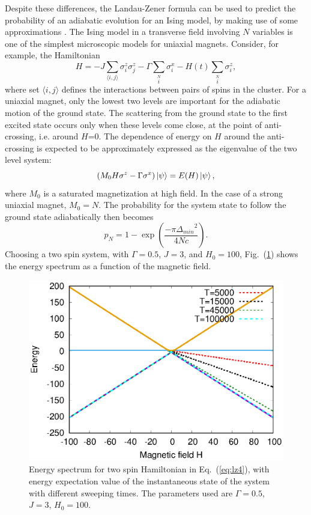 \documentclass[../main.tex]{subfiles}
\begin{document}
Despite these differences, the Landau-Zener formula can be used to predict the probability of an adiabatic evolution for an Ising model, by making use of some approximations \cite{miyashita1996observation}. The Ising model in a transverse field involving $N$ variables is one of the simplest microscopic models for uniaxial magnets. Consider, for example, the Hamiltonian
\begin{equation}
H=-J \sum \limits_{\langle i,j\rangle} \sigma_i^z \sigma_j^z - \Gamma \sum \limits_i \limits^N \sigma_i^x -H(t) \sum \limits_i \limits^N\sigma_i^z, \label{eq:lz4}
\end{equation} 
where set $\langle i,j \rangle$ defines the interactions between pairs of spins in the cluster. For a uniaxial magnet, only the lowest two levels are important for the adiabatic motion of the ground state. The scattering from the ground state to the first excited state occurs only when these levels come close, at the point of anti-crossing, i.e. around $H$=0. The dependence of energy on $H$ around the anti-crossing is expected to be approximately expressed  as the eigenvalue of the two level system:
\begin{equation}
(M_0H\sigma^z-\Gamma \sigma^x)\ket{\psi}=E(H)\ket{\psi}, \label{eq:lz6}
\end{equation}
where $M_0$ is a saturated magnetization at high field. In the case of a strong uniaxial magnet, $M_0=N$. The probability for the system state to follow the ground state adiabatically then becomes
\begin{equation}
p_N=1-\exp(\frac{-\pi {\Delta_{min}}^2}{4Nc}). \label{eq:lz5}
\end{equation}
Choosing a two spin system, with $\Gamma=0.5$, $J=3$, and $H_0=100$, Fig.~(\ref{fig:lz4}) shows the energy spectrum as a function of the magnetic field.
\begin{figure}[H]
\centering 
\includegraphics[scale=0.8]{EnergySpectrum_H100.eps}
\caption{Energy spectrum for two spin Hamiltonian in Eq.~(\ref{eq:lz4}), with energy expectation value of the instantaneous state of the system with different sweeping times. The parameters used are $\Gamma=0.5$, $J=3$, $H_0=100$.}
\label{fig:lz4}
\end{figure}
\end{document}
